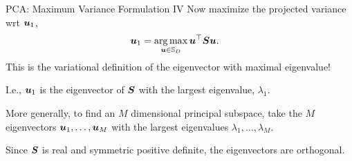 \documentclass[aspectratio=169]{beamer}
\begin{document}
\begin{frame}[t]{PCA: Maximum Variance Formulation IV}
Now maximize the projected variance wrt $\boldsymbol{u}_1$, 
\begin{align}
    \boldsymbol{u}_1 &= \operatorname*{arg\,max}_{\boldsymbol{u} \in \mathbb{S}_{D}} \boldsymbol{u}^\top \boldsymbol{S} \boldsymbol{u}.
\end{align}
This is the variational definition of the eigenvector with maximal eigenvalue! 

I.e., $\boldsymbol{u}_1$ is the eigenvector of $\boldsymbol{S}$ with the largest eigenvalue, $\lambda_1$.



More generally, to find an $M$ dimensional principal subspace, take the $M$ eigenvectors $\boldsymbol{u}_1, \ldots, \boldsymbol{u}_M$ with the largest eigenvalues $\lambda_1, \ldots, \lambda_M$.

Since $\boldsymbol{S}$ is real and symmetric positive definite, the eigenvectors are orthogonal.

\end{frame} 


    

    
\end{document}
